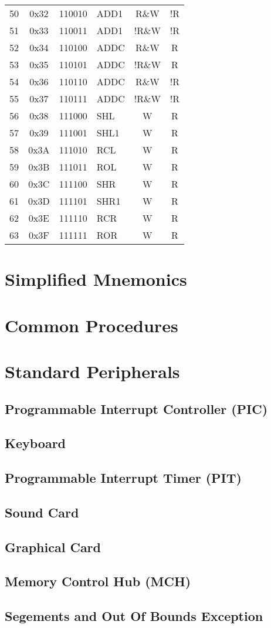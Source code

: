 \documentclass[oneside, a4paper]{memoir}
\begin{document}
\begin{center}
\begin{longtable}{ccclcc}
50 & 0x32 & 110010 & ADD1            & R\&W  & !R  \\
51 & 0x33 & 110011 & ADD1            & !R\&W & !R  \\
52 & 0x34 & 110100 & ADDC            & R\&W  & R   \\
53 & 0x35 & 110101 & ADDC            & !R\&W & R   \\
54 & 0x36 & 110110 & ADDC            & R\&W  & !R  \\
55 & 0x37 & 110111 & ADDC            & !R\&W & !R  \\
56 & 0x38 & 111000 & SHL             & W     & R   \\
57 & 0x39 & 111001 & SHL1            & W     & R   \\
58 & 0x3A & 111010 & RCL             & W     & R   \\
59 & 0x3B & 111011 & ROL             & W     & R   \\
60 & 0x3C & 111100 & SHR             & W     & R   \\
61 & 0x3D & 111101 & SHR1            & W     & R   \\
62 & 0x3E & 111110 & RCR             & W     & R   \\
63 & 0x3F & 111111 & ROR             & W     & R   \\
\end{longtable}
\end{center}

\chapter{Simplified Mnemonics}

\chapter{Common Procedures}

\chapter{Standard Peripherals}
\section{Programmable Interrupt Controller (PIC)}
\section{Keyboard}
\section{Programmable Interrupt Timer (PIT)}
\section{Sound Card}
\section{Graphical Card}
\section{Memory Control Hub (MCH)}
\section{Segements and Out Of Bounds Exception}
\end{document}
